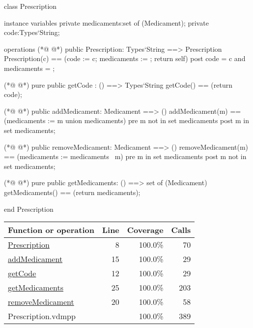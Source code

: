\begin{vdmpp}[breaklines=true]
class Prescription

instance variables
  private medicaments:set of (Medicament);
  private code:Types`String;
  
operations
(*@
\label{Prescription:8}
@*)
 public Prescription: Types`String ==> Prescription
  Prescription(c) == (code := c; medicaments := {}; return self)
 post code = c and medicaments = {};
 
(*@
\label{getCode:12}
@*)
 pure public getCode : () ==> Types`String
  getCode() == (return code);
  
(*@
\label{addMedicament:15}
@*)
 public addMedicament: Medicament ==> ()
  addMedicament(m) == (medicaments := {m} union medicaments)
 pre m not in set medicaments
 post m in set medicaments;
  
(*@
\label{removeMedicament:20}
@*)
 public removeMedicament: Medicament ==> ()
  removeMedicament(m) == (medicaments := medicaments \ {m})
 pre m in set medicaments
 post m not in set medicaments;
  
(*@
\label{getMedicaments:25}
@*)
 pure public getMedicaments: () ==> set of (Medicament)
  getMedicaments() == (return medicaments);

end Prescription
\end{vdmpp}
\bigskip
\begin{longtable}{|l|r|r|r|}
\hline
Function or operation & Line & Coverage & Calls \\
\hline
\hline
\hyperref[Prescription:8]{Prescription} & 8&100.0\% & 70 \\
\hline
\hyperref[addMedicament:15]{addMedicament} & 15&100.0\% & 29 \\
\hline
\hyperref[getCode:12]{getCode} & 12&100.0\% & 29 \\
\hline
\hyperref[getMedicaments:25]{getMedicaments} & 25&100.0\% & 203 \\
\hline
\hyperref[removeMedicament:20]{removeMedicament} & 20&100.0\% & 58 \\
\hline
\hline
Prescription.vdmpp & & 100.0\% & 389 \\
\hline
\end{longtable}


